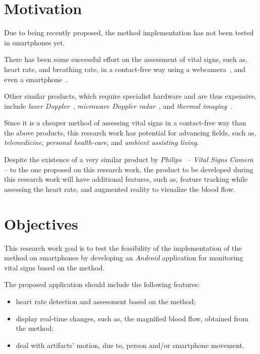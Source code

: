 \section{Motivation} \label{sec:motivation}

Due to being recently proposed, the \evm{} method implementation 
has not been tested in smartphones yet.

There has been some successful effort on the assessment of vital 
signs, such as, heart rate, and breathing rate, in a contact-free 
way using a webcamera~\cite{Wu2012Eulerian, Poh2010Non, Poh2011Advancements}, 
and even a smartphone~\cite{Philips2013}.

Other similar products, which require specialist hardware and are 
thus expensive, include \emph{laser Doppler}~\cite{Ulyanov1993Pulse}, 
\emph{microwave Doppler radar}~\cite{Greneker1997Radar}, and 
\emph{thermal imaging}~\cite{Garbey2007Contact}.

Since it is a cheaper method of assessing vital signs in a 
contact-free way than the above products, this research work has 
potential for advancing fields, such as, \emph{telemedicine}, 
\emph{personal health-care}, and \emph{ambient assisting living}.

Despite the existence of a very similar product by 
\emph{Philips}~\cite{Philips2013} -- \emph{Vital Signs Camera} -- 
to the one proposed on this research work, the product to be developed 
during this research work will have additional features, such as, 
feature tracking while assessing the heart rate, and augmented reality 
to visualize the blood flow.

\section{Objectives} \label{sec:objectives}


This research work goal is to test the feasibility of the 
implementation of the \evm{} method on smartphones by developing
an \emph{Android} application for monitoring vital signs based on 
the \evm{} method.

The proposed application should include the following features:

\begin{itemize}
  \item heart rate detection and assessment based on the \evm{} 
        method;
  \item display real-time changes, such as, the magnified blood 
        flow, obtained from the \evm{} method;
  \item deal with artifacts' motion, due to, person and/or 
        smartphone movement.
\end{itemize}

